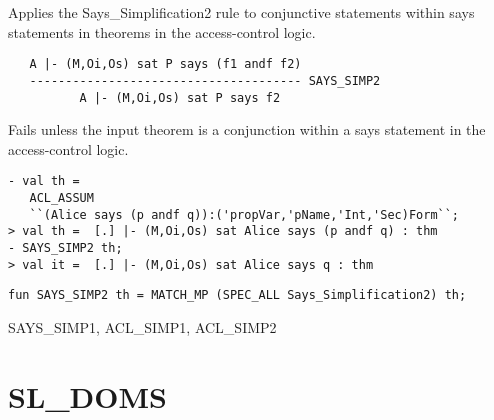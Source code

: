 

\egroup

\SYNOPSIS
Applies the Says_Simplification2 rule to conjunctive statements within
says statements in theorems in the access-control logic.

\DESCRIBE
\begin{verbatim}
   A |- (M,Oi,Os) sat P says (f1 andf f2)
   -------------------------------------- SAYS_SIMP2
          A |- (M,Oi,Os) sat P says f2
\end{verbatim}

\FAILURE
Fails unless the input theorem is a conjunction within a
says statement in the access-control logic.

\EXAMPLE
\begin{holboxed}
\begin{verbatim}
- val th = 
   ACL_ASSUM 
   ``(Alice says (p andf q)):('propVar,'pName,'Int,'Sec)Form``;
> val th =  [.] |- (M,Oi,Os) sat Alice says (p andf q) : thm
- SAYS_SIMP2 th;
> val it =  [.] |- (M,Oi,Os) sat Alice says q : thm
\end{verbatim}
\end{holboxed}

\IMPLEMENTATION
\begin{holboxed}
\begin{verbatim}
fun SAYS_SIMP2 th = MATCH_MP (SPEC_ALL Says_Simplification2) th;
\end{verbatim}
\end{holboxed}

\SEEALSO
SAYS\_SIMP1, ACL\_SIMP1, ACL\_SIMP2
\ENDDOC

\section{SL\_DOMS}

